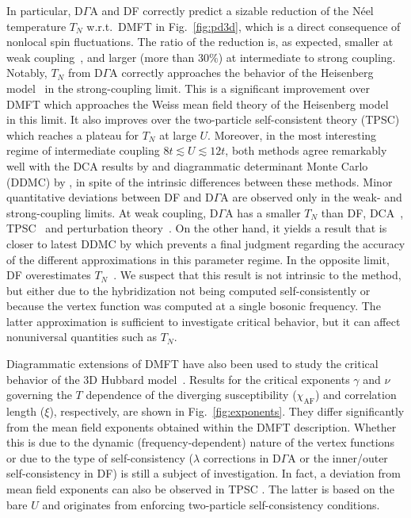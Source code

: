 \documentclass[rmp,aps,reprint,amsmath,amssymb,superscriptaddress,showpacs,nofootinbib]{revtex4-1}
\begin{document}
In particular, D$\Gamma$A and DF correctly predict a sizable reduction of the  N\'eel temperature $T_{N}$  w.r.t.~DMFT in Fig.~\ref{fig:pd3d}, which is a direct consequence of nonlocal spin fluctuations. The ratio of the reduction is, as expected, smaller at weak coupling~\cite{Schauerte2002}, and larger (more than $30\%$)  at intermediate to strong coupling. Notably, $T_{N}$ from D$\Gamma$A correctly approaches the  behavior of the Heisenberg model~\cite{Sandvik98} in the strong-coupling limit. This is a significant improvement over  DMFT which approaches the Weiss mean field theory of the Heisenberg model~\cite{Takahashi77} in this limit. It also improves over the two-particle self-consistent  theory (TPSC) \cite{Vilk1997} which reaches a plateau for $T_N$ at large $U$. Moreover, in the most interesting regime of intermediate coupling $8t\lesssim U \lesssim12t$, both methods agree remarkably well with the DCA results by  and diagrammatic determinant Monte Carlo (DDMC)  by , in spite of the intrinsic differences between these methods. Minor quantitative deviations between DF and D$\Gamma$A are observed only in the weak- and strong-coupling limits. At weak coupling, D$\Gamma$A has a smaller $T_N$ than DF, DCA~\cite{Kent2005}, TPSC~\cite{Dare2000} and perturbation theory~\cite{Schauerte2002}. On the other hand, it yields a result that is closer to  latest DDMC by  which prevents a final judgment regarding the accuracy of the different approximations in this parameter regime. In the opposite limit, DF overestimates $T_{N}$~\cite{Hirschmeier2015}. We suspect that this result is not intrinsic to the method, but either due to the hybridization not being computed self-consistently or because the vertex function was computed at a single bosonic frequency. The latter approximation is sufficient to investigate critical behavior, but it can affect nonuniversal quantities such as $T_{N}$.  

Diagrammatic extensions of DMFT have also been used to study the critical behavior of the 3D Hubbard model~\cite{Rohringer2011,Hirschmeier2015}. Results for the critical exponents $\gamma$ and $\nu$ governing the $T$ dependence of the diverging susceptibility ($\chi_{\text{AF}}$) and correlation length ($\xi$), respectively, are shown in Fig.~\ref{fig:exponents}. They differ significantly from the mean field exponents obtained within the DMFT description. Whether this is due to the dynamic (frequency-dependent) nature of the vertex functions or due to the type of self-consistency ($\lambda$ corrections in D$\Gamma$A or the inner/outer self-consistency in DF) is still a subject of investigation. In fact, a deviation from mean field exponents can also be observed in TPSC \cite{Dare2000}. The latter is based on the bare $U$ and  originates from enforcing two-particle self-consistency conditions. 
\end{document}
